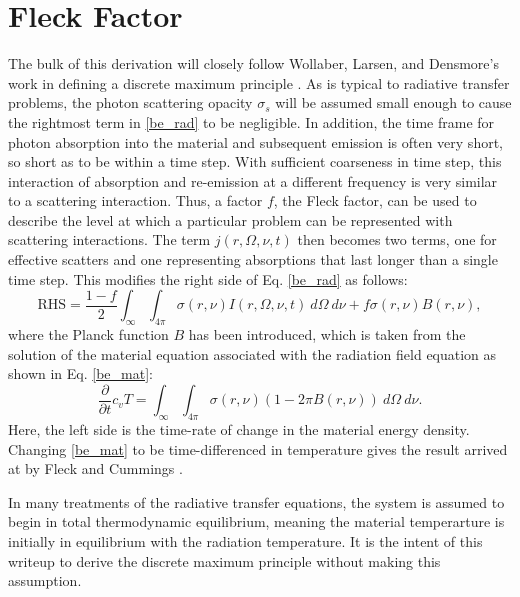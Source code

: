 \section{Fleck Factor}
The bulk of this derivation will closely follow Wollaber, Larsen, and
Densmore's work in defining a discrete maximum principle \cite{WolLarDen}.  As
is typical to radiative transfer problems, the photon scattering opacity
$\sigma_s$ will be assumed small enough to cause the rightmost term in
\eqref{be_rad} to be negligible.  In addition, the time frame for photon
absorption into the material and subsequent emission is often very short, so
short as to be within a time step.  With sufficient coarseness in time step,
this interaction of absorption and re-emission at a different frequency is very
similar to a scattering interaction.  Thus, a factor $f$, the Fleck factor, can
be used to describe the level at which a particular problem can be represented
with scattering interactions.  The term $j(r,\Omega,\nu,t)$ then becomes two
terms, one for effective scatters and one representing absorptions that last
longer than a single time step.  This modifies the right side
 of Eq. \eqref{be_rad} as follows:
\begin{equation}
\mbox{RHS} = \frac{1-f}{2}\int_{\infty}\int_{4\pi}
    \sigma(r,\nu)I(r,\Omega,\nu,t)\ d\Omega\ d\nu +
  f\sigma(r,\nu)B(r,\nu),
\end{equation}
where the Planck function $B$ has been introduced, which is taken from the
solution of
the material equation associated with the radiation field equation as shown in
Eq. \eqref{be_mat}:
\begin{equation}
\frac{\partial}{\partial t}c_vT=\int_\infty\int_{4\pi}\sigma(r,\nu)(1-2\pi
  B(r,\nu))\ d\Omega\ d\nu \label{be_mat}.
\end{equation}
Here, the left side is the time-rate of change in the material
energy density.  Changing  \eqref{be_mat} to be time-differenced in
temperature gives the result arrived at by Fleck and Cummings \cite{FleckCumm}.

In many treatments of the radiative transfer equations, the
system is assumed to begin in total thermodynamic equilibrium, meaning the
material temperarture is initially in equilibrium with the radiation
temperature.
 It is the intent of this writeup to derive the discrete maximum principle
without making this assumption.